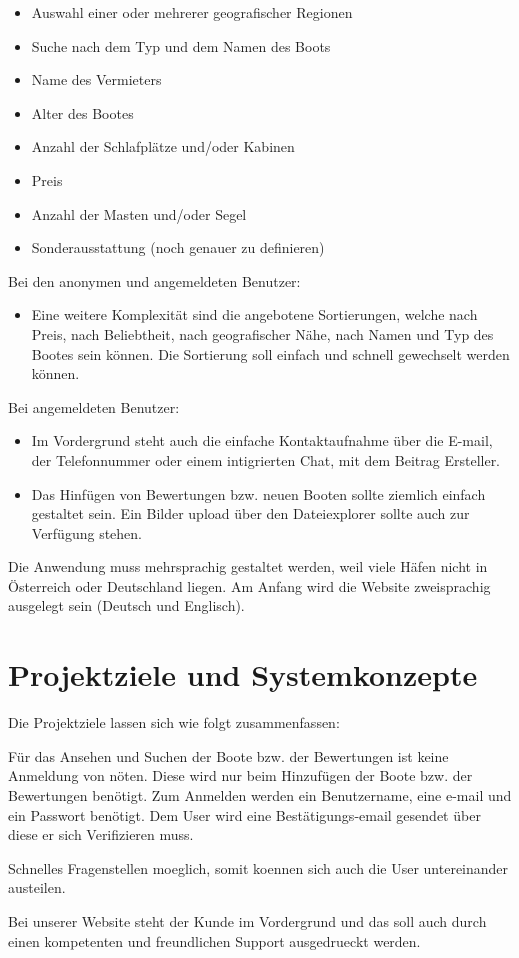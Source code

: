 \documentclass[12pt]{article}
\theoremstyle{definition}
\begin{document}
\begin{itemize}
   \item Auswahl einer oder mehrerer geografischer Regionen
   \item Suche nach dem Typ und dem Namen des Boots
   \item Name des Vermieters
   \item Alter des Bootes
   \item Anzahl der Schlafplätze und/oder Kabinen
   \item Preis
   \item Anzahl der Masten und/oder Segel
   \item Sonderausstattung (noch genauer zu definieren)
\end{itemize}

Bei den anonymen und angemeldeten Benutzer:
\begin{itemize}
   \item Eine weitere Komplexität sind die angebotene Sortierungen, welche nach Preis, nach Beliebtheit, nach geografischer Nähe, nach Namen und Typ des Bootes sein können. Die Sortierung soll einfach und schnell gewechselt werden können.
\end{itemize}

Bei angemeldeten Benutzer:

\begin{itemize}
   \item Im Vordergrund steht auch die einfache Kontaktaufnahme über die E-mail, der Telefonnummer oder einem intigrierten Chat, mit dem Beitrag Ersteller.

   \item Das Hinfügen von Bewertungen bzw. neuen Booten sollte ziemlich einfach gestaltet sein. Ein Bilder upload über den Dateiexplorer sollte auch zur Verfügung stehen.
\end{itemize}


Die Anwendung muss mehrsprachig gestaltet werden, weil viele Häfen nicht in Österreich oder Deutschland liegen. Am Anfang wird die Website zweisprachig ausgelegt sein (Deutsch und Englisch).

\pagebreak

\section{Projektziele und Systemkonzepte}
Die Projektziele lassen sich wie folgt zusammenfassen:

Für das Ansehen und Suchen der Boote bzw. der Bewertungen ist keine Anmeldung von nöten. Diese wird nur beim Hinzufügen der Boote bzw. der Bewertungen benötigt.
Zum Anmelden werden ein Benutzername, eine e-mail und ein Passwort benötigt. Dem User wird eine Bestätigungs-email gesendet über diese er sich Verifizieren muss. 
\item Schnelles Fragenstellen moeglich, somit koennen sich auch die User untereinander austeilen.
\item Bei unserer Website steht der Kunde im Vordergrund und das soll auch durch einen kompetenten und freundlichen Support ausgedrueckt werden. 
\end{document}

